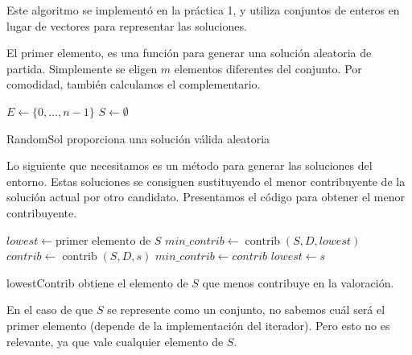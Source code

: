 \documentclass{article}
\begin{document}
Este algoritmo se implementó en la práctica 1, y utiliza conjuntos de enteros en lugar de vectores para representar
las soluciones.

El primer elemento, es una función para generar una solución aleatoria de partida. Simplemente se eligen $m$ elementos 
diferentes del conjunto. Por comodidad, también calculamos el complementario.

\begin{algorithm}[H]
	\DontPrintSemicolon %
	$E \gets \{0,\ldots, n-1\}$ 
	$S \gets \emptyset$ 
	\;
	 
	\caption{{\sc RandomSol} proporciona una solución válida aleatoria}
	\label{alg:randomsol-ls}
\end{algorithm}

Lo siguiente que necesitamos es un método para generar las soluciones del entorno. Estas soluciones se consiguen sustituyendo
el menor contribuyente de la solución actual por otro candidato. Presentamos el código para obtener el menor contribuyente.

\begin{algorithm}[H]
	\DontPrintSemicolon %
	$lowest \gets \text{primer elemento de } S$\;
	$min\_contrib \gets \operatorname{contrib}(S,D,lowest)$\;
	 {
		$contrib \gets \operatorname{contrib}(S,D,s)$\;
		 { 
			$min\_contrib \gets contrib$\;
			$lowest \gets s$ 
		}
	}
	\;
	\;
	\caption{{\sc lowestContrib} obtiene el elemento de $S$ que menos contribuye en la valoración.}
	\label{alg:lowest-contributor-ls}
\end{algorithm}

En el caso de que $S$ se represente como un conjunto, no sabemos cuál será el primer elemento (depende de la implementación del iterador). Pero
esto no es relevante, ya que vale cualquier elemento de $S$.
\end{document}
